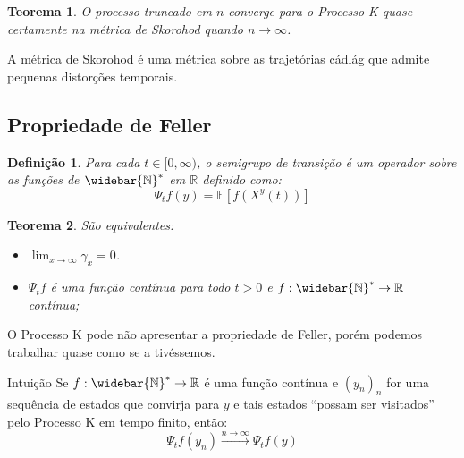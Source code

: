 \documentclass[xcolor=pdftex,dvipsnames]{beamer}
\newcommand{\Nzb}{{\mathbb{\widebar{N}^*}}}
\newcommand{\R}{{\mathbb{R}}}
\newcommand{\E}{{\mathbb{E}}}
\newtheorem{teorema}{Teorema}
\newtheorem{definicao}{Definição}
\begin{document}
\begin{frame}
  \begin{teorema}
    O processo truncado em $n$ converge para o Processo K quase
    certamente na métrica de Skorohod quando $n \to \infty$.
  \end{teorema}

  A métrica de Skorohod é uma métrica sobre as trajetórias cádlág que
  admite pequenas distorções temporais.
\end{frame}


\subsection{Propriedade de Feller}

\begin{frame}

  \begin{definicao}
    Para cada $t \in [0, \infty)$, o semigrupo de transição é um
    operador sobre as funções de $\Nzb$ em $\R$ definido como:
    \begin{displaymath}
      \Psi_t f (y) = \E \left[ f(X^y(t)) \right]
    \end{displaymath}
  \end{definicao} \pause

  \begin{teorema}
    São equivalentes:
    \begin{itemize}
    \item $\displaystyle \lim_{x \to \infty} \gamma_x = 0$.
    \item $\Psi_t f$ é uma função contínua para todo $t > 0$ e $f:
      \Nzb \to \R$ contínua;
    \end{itemize}
  \end{teorema}
\end{frame}

\begin{frame}

  O Processo K pode não apresentar a propriedade de Feller, porém
  podemos trabalhar quase como se a tivéssemos.


  \begin{block}{Intuição}
    Se $f: \Nzb \to \R$ é uma função contínua e $(y_n)_n$ for uma
    sequência de estados que convirja para $y$ e tais estados ``possam
    ser visitados'' pelo Processo K em tempo finito, então:
    \begin{displaymath}  
      \Psi_t f (y_n) \xrightarrow{n \to \infty} \Psi_t f (y)
    \end{displaymath}
  \end{block}
\end{frame}
\end{document}
